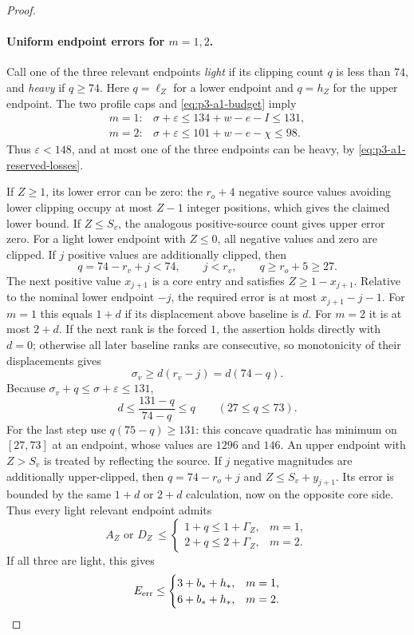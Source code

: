 \documentclass[11pt,letterpaper]{article}
\theoremstyle{definition}\newtheorem{definition}[theorem]{Definition}
\begin{document}
\begin{proof}
\paragraph{Uniform endpoint errors for $m=1,2$.}
Call one of the three relevant endpoints \emph{light} if its clipping
count $q$ is less than $74$, and \emph{heavy} if $q\ge74$. Here
$q=\ell_Z$ for a lower endpoint and $q=h_Z$ for the upper endpoint.
The two profile caps and \eqref{eq:p3-a1-budget} imply
\begin{equation}\label{eq:p3-a1-light-caps}
 \begin{array}{ll}
 m=1:&\sigma+\varepsilon\le134+w-e-I\le131,\\
 m=2:&\sigma+\varepsilon\le101+w-e-\chi\le98.
 \end{array}
\end{equation}
Thus $\varepsilon<148$, and at most one of the three endpoints can be
heavy, by \eqref{eq:p3-a1-reserved-losses}.

If $Z\ge1$, its lower error can be zero: the $r_o+4$ negative source
values avoiding lower clipping occupy at most $Z-1$ integer positions,
which gives the claimed lower bound. If $Z\le S_v$, the analogous
positive-source count gives upper error zero.
For a light lower endpoint with $Z\le0$, all negative values and zero
are clipped. If $j$ positive values are additionally clipped, then
\[
 q=74-r_v+j<74,\qquad j<r_v,\qquad q\ge r_o+5\ge27.
\]
The next positive value $x_{j+1}$ is a core entry and satisfies
$Z\ge1-x_{j+1}$. Relative to the nominal lower endpoint $-j$, the
required error is at most $x_{j+1}-j-1$.
For $m=1$ this equals $1+d$ if its displacement above baseline is $d$.
For $m=2$ it is at most $2+d$. If the next rank is the forced $1$, the
assertion holds directly with $d=0$; otherwise all later baseline
ranks are consecutive, so monotonicity of their displacements gives
\[
 \sigma_v\ge d(r_v-j)=d(74-q).
\]
Because $\sigma_v+q\le\sigma+\varepsilon\le131$,
\begin{equation}\label{eq:p3-a1-displacement}
 d\le\frac{131-q}{74-q}\le q\qquad(27\le q\le73).
\end{equation}
For the last step use $q(75-q)\ge131$: this concave quadratic has
minimum on $[27,73]$ at an endpoint, whose values are $1296$ and
$146$. An upper endpoint with $Z>S_v$ is treated by reflecting the
source. If $j$ negative magnitudes are additionally upper-clipped,
then $q=74-r_o+j$ and $Z\le S_v+y_{j+1}$. Its error is bounded by
the same $1+d$ or $2+d$ calculation, now on the opposite core side.
Thus every light relevant endpoint admits
\[
 A_Z\text{ or }D_Z\ \le
 \begin{cases}1+q\le1+\Gamma_Z,&m=1,\\
               2+q\le2+\Gamma_Z,&m=2.
 \end{cases}
\]
If all three are light, this gives
\begin{equation}\label{eq:p3-a1-all-light}
 E_{\rm err}\le
 \begin{cases}3+b_*+h_*,&m=1,\\
               6+b_*+h_*,&m=2.
 \end{cases}
\end{equation}


\end{proof}
\end{document}
